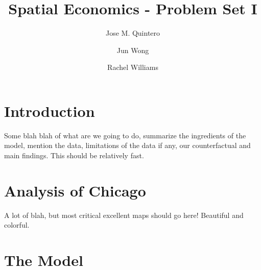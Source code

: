 \documentclass[12pt]{article}
\title{Spatial Economics - Problem Set I}
\author{Jose M. Quintero \and Jun Wong \and Rachel Williams}
\begin{document}
\maketitle

\section{Introduction}

Some blah blah of what are we going to do, summarize the ingredients of the model, mention the data, limitations of the data if any, our counterfactual and main findings. This should be relatively fast. 

\section{Analysis of Chicago}

A lot of blah, but most critical excellent maps should go here! Beautiful and colorful. 

\section{The Model}
\end{document}

